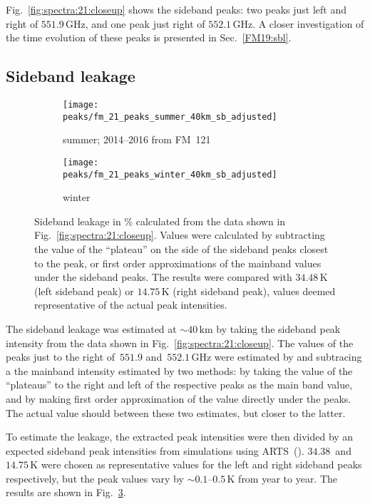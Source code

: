 Fig.~\ref{fig:spectra:21:closeup} shows the sideband peaks:  two peaks just
left and right of $551.9\,\mathrm{GHz}$, and one peak just right of
$552.1\,\mathrm{GHz}$.  A closer investigation of the time evolution of these
peaks is presented in Sec.~\ref{FM19:sbl}.


\subsection{Sideband leakage}
\label{FM21:sbl}

\begin{figure}[ht]
    \centering
    \begin{subfigure}[b]{0.9545\textwidth}
        \texttt{[image: peaks/fm\_21\_peaks\_summer\_40km\_sb\_adjusted]}
        \caption{summer; 2014--2016 from FM~121
            }\label{fig:sbl:21:summer}
    \end{subfigure}
    \begin{subfigure}[b]{0.9545\textwidth}
        \texttt{[image: peaks/fm\_21\_peaks\_winter\_40km\_sb\_adjusted]}
        \caption{winter}\label{fig:sbl:21:winter}
    \end{subfigure}
    \caption{Sideband leakage in \% calculated from the data shown in
        Fig.~\ref{fig:spectra:21:closeup}.  Values were calculated by
        subtracting the value of the ``plateau'' on the side of the sideband
        peaks closest to the  peak, or first order
        approximations of the mainband values under the sideband peaks.  The
        results were compared with $34.48\,\mathrm{K}$ (left sideband peak) or
        $14.75\,\mathrm{K}$ (right sideband peak), values deemed
        representative of the actual peak intensities.
        }\label{fig:sbl:21}
\end{figure}

\noindent
The sideband leakage was estimated at $\sim40\,\mathrm{km}$ by taking the
sideband peak intensity from the data shown in
Fig.~\ref{fig:spectra:21:closeup}. The values of the peaks just to the right
of~$551.9$ and~$552.1\,\mathrm{GHz}$ were estimated by and subtracing a the
mainband intensity estimated by two methods:  by taking the value of the
``plateaus'' to the right and left of the respective peaks as the main band
value, and by making first order approximation of the value directly under the
peaks.  The actual value should between these two estimates, but closer to the
latter.

To estimate the leakage, the extracted peak intensities were then
divided by an expected sideband peak intensities from simulations using
ARTS~(\cite{buehler:artst:05}).  $34.38$~and $14.75\,\mathrm{K}$ were chosen as
representative values for the left and right sideband peaks respectively, but
the peak values vary by $\sim0.1$--$0.5\,\mathrm{K}$ from year to year.  The
results are shown in Fig.~\ref{fig:sbl:21}.

